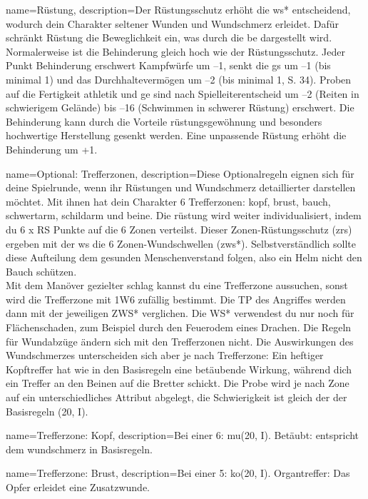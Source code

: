 {
    name={Rüstung},
description={Der Rüstungsschutz erhöht die \gls{ws*} entscheidend, wodurch dein Charakter seltener Wunden und Wundschmerz erleidet. Dafür schränkt Rüstung die Beweglichkeit ein, was durch die \gls{be} dargestellt wird. Normalerweise ist die Behinderung gleich hoch wie der Rüstungsschutz. Jeder Punkt Behinderung erschwert Kampfwürfe um –1, senkt die \gls{gs} um –1 (bis minimal 1) und das Durchhaltevermögen um –2 (bis minimal 1, S. 34). Proben auf die Fertigkeit \gls{athletik} und \gls{ge} sind nach Spielleiterentscheid um –2 (Reiten in schwierigem Gelände) bis –16 (Schwimmen in schwerer Rüstung) erschwert. Die Behinderung kann durch die Vorteile \gls{rüstungsgewöhnung} und besonders hochwertige Herstellung gesenkt werden. Eine unpassende Rüstung erhöht die Behinderung um +1.}}

{
    name={Optional: Trefferzonen},
    description={Diese Optionalregeln eignen sich für deine Spielrunde, wenn ihr Rüstungen und Wundschmerz detaillierter darstellen möchtet. Mit ihnen hat dein Charakter 6 Trefferzonen: \gls{kopf}, \gls{brust}, \gls{bauch}, \gls{schwertarm}, \gls{schildarm} und \gls{beine}. Die \gls{rüstung} wird weiter individualisiert, indem du 6 x RS Punkte auf die 6 Zonen verteilst. Dieser Zonen-Rüstungsschutz (\gls{zrs}) ergeben mit der \gls{ws} die 6 Zonen-Wundschwellen (\gls{zws}*). Selbstverständlich sollte diese Aufteilung dem gesunden Menschenverstand folgen, also ein Helm nicht den Bauch schützen.\\
Mit dem Manöver \gls{gezielter schlag} kannst du eine Trefferzone aussuchen, sonst wird die Trefferzone mit 1W6 zufällig bestimmt. Die TP des Angriffes werden dann mit der jeweiligen ZWS* verglichen. Die WS* verwendest du nur noch für Flächenschaden, zum Beispiel durch den Feuerodem eines Drachen. Die Regeln für Wundabzüge ändern sich mit den Trefferzonen nicht. Die Auswirkungen des Wundschmerzes unterscheiden sich aber je nach Trefferzone: Ein heftiger Kopftreffer hat wie in den Basisregeln eine betäubende Wirkung, während dich ein Treffer an den Beinen auf die Bretter schickt. Die Probe wird je nach Zone auf ein unterschiedliches Attribut abgelegt, die Schwierigkeit ist gleich der der Basisregeln (20, I).}}

{
    name={Trefferzone: Kopf},
    description={Bei einer 6: \gls{mu}(20, I). Betäubt: entspricht dem \gls{wundschmerz} in Basisregeln.}}

{
    name={Trefferzone: Brust},
    description={Bei einer 5: \gls{ko}(20, I). Organtreffer: Das Opfer erleidet eine Zusatzwunde.}}

